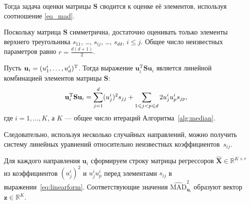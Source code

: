 Тогда задача оценки матрицы $\mathbf{S}$ сводится к оценке её элементов, используя соотношение \eqref{eq_mad}.

Поскольку матрица $\mathbf{S}$ симметрична, достаточно оценивать только элементы верхнего треугольника $s_{11}$, \ldots, $s_{ij}$, \ldots, $s_{dd}$, $i \leqslant j$. 
Общее число неизвестных параметров равно $r = \frac{d(d+1)}{2}$.

Пусть $\mathbf{u}_i = (u_1^i, \ldots, u_d^i)^{\mathrm{T}}$. Тогда выражение $\mathbf{u}_i^{\mathrm{T}}\mathbf{S}\mathbf{u}_i$
является линейной комбинацией элементов матрицы $\mathbf{S}$:
\begin{equation}\label{eq:linearform}
    \mathbf{u}_i^{\mathrm{T}} \mathbf{S} \mathbf{u}_i = \sum_{j = 1}^d (u_j^i)^2 s_{jj} + \sum_{1 \leqslant j < p \leqslant d} 2 u_j^i u_p^i s_{jp},
\end{equation}
где $i = 1, \ldots, K$, а $K$ --- общее число итераций Алгоритма~\ref{alg:median}.

Следовательно, используя несколько случайных направлений, можно получить систему линейных уравнений относительно неизвестных коэффициентов~$s_{ij}$.

Для каждого направления $\mathbf{u}_i$ сформируем строку матрицы регрессоров $\hat{\mathbf{X}}\in \mathbb{R}^{K \times r}$ из коэффициентов $(u_j^i)^2$ и $u_j^i u_p^i$ перед элементами $s_{ij}$ в выражении~\eqref{eq:linearform}. Соответствующие значения $\widehat{\mathrm{MAD}}_{\mathbf{u}_i}^2$ образуют вектор $\mathbf{z} \in \mathbb{R}^K$.



